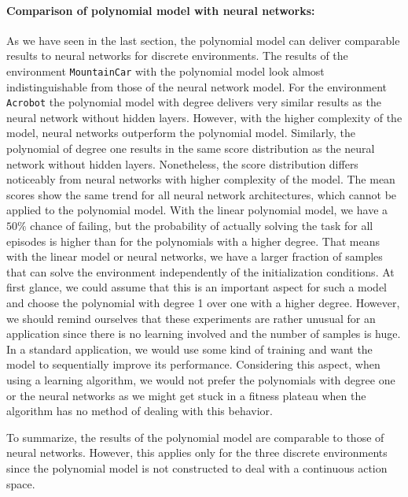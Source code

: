 \paragraph*{Comparison of polynomial model with neural networks:} As we have seen in the last section, the polynomial model can deliver comparable results to neural networks for discrete environments. The results of the environment \texttt{MountainCar} with the polynomial model look almost indistinguishable from those of the neural network model. For the environment \texttt{Acrobot} the polynomial model with degree delivers very similar results as the neural network without hidden layers. However, with the higher complexity of the model, neural networks outperform the polynomial model. Similarly, the polynomial of degree one results in the same score distribution as the neural network without hidden layers. Nonetheless, the score distribution differs noticeably from neural networks with higher complexity of the model. The mean scores show the same trend for all neural network architectures, which cannot be applied to the polynomial model. With the linear polynomial model, we have a $50 \%$ chance of failing, but the probability of actually solving the task for all episodes is higher than for the polynomials with a higher degree. That means with the linear model or neural networks, we have a larger fraction of samples that can solve the environment independently of the initialization conditions. At first glance, we could assume that this is an important aspect for such a model and choose the polynomial with degree 1 over one with a higher degree. However, we should remind ourselves that these experiments are rather unusual for an application since there is no learning involved and the number of samples is huge. In a standard application, we would use some kind of training and want the model to sequentially improve its performance. Considering this aspect, when using a learning algorithm, we would not prefer the polynomials with degree one or the neural networks as we might get stuck in a fitness plateau when the algorithm has no method of dealing with this behavior.

To summarize, the results of the polynomial model are comparable to those of neural networks. However, this applies only for the three discrete environments since the polynomial model is not constructed to deal with a continuous action space.

